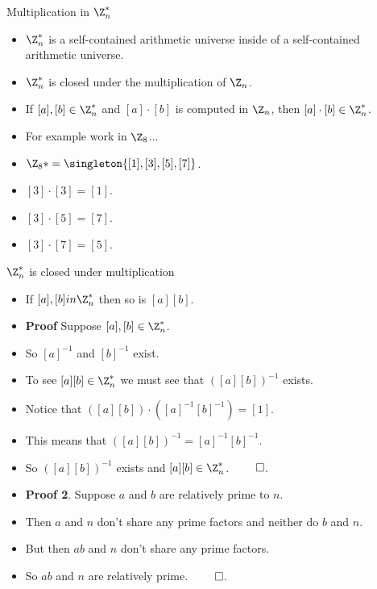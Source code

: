 \documentclass[handout]{beamer}
\begin{document}
\begin{frame}{Multiplication in $\Z^*_n$}

\begin{itemize}
  \item $\Z_n^*$ is a self-contained arithmetic universe inside of a self-contained
  arithmetic universe.
  \item $\Z_n^*$ is closed under the multiplication of $\Z_n$.
  \item If $[a],[b]\in\Z_n^*$ and $[a]\cdot[b]$ is computed in $\Z_n$, then
  $[a]\cdot[b]\in\Z_n^*$.
  \item For example work in $\Z_8$...
  \item $\Z_8* = \singleton{[1],[3],[5],[7]}$.
  \item $[3]\cdot [3] = [1]$.
  \item $[3]\cdot [5] = [7]$.
  \item $[3] \cdot [7] = [5]$.
\end{itemize}

\end{frame}

\begin{frame}{$\Z^*_n$ is closed under multiplication}

\begin{itemize}
  \item If $[a],[b] in\Z_n^*$ then so is $[a][b]$.
  \item \textbf{Proof} Suppose $[a],[b]\in\Z_n^*$.
  \item So $[a]^{-1}$ and $[b]^{-1}$ exist.
  \item To see $[a][b]\in\Z_n^*$ we must see that $([a][b])^{-1}$ exists.
  \item Notice that $([a][b])\cdot ([a]^{-1}[b]^{-1}) = [1]$.
  \item This means that $([a][b])^{-1} = [a]^{-1}[b]^{-1}$.
  \item So $([a][b])^{-1}$ exists and $[a][b]\in\Z_n^*$. $\qed$.
  \item \textbf{Proof 2}. Suppose $a$ and $b$ are relatively prime to $n$.
  \item Then $a$ and $n$ don't share any prime factors and neither do $b$ and $n$.
  \item But then $ab$ and $n$ don't share any prime factors.
  \item So $ab$ and $n$ are relatively prime. $\qed$.
\end{itemize}

\end{frame}
\end{document}
